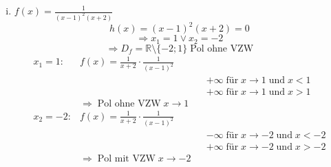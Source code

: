 \documentclass{book}
\begin{document}
\begin{enumerate}[i)]
    \item $f(x) = \frac 1{(x-1)^2(x+2)}$
        \[h(x) = (x-1)^2(x+2) = 0\]
        \[\Rightarrow x_1 = 1 \vee x_2 = -2\]
        \[\Rightarrow D_f = \mathbb{R} \setminus \{-2; 1\} \; \text{Pol ohne VZW}\]
        \begin{align*}
            x_1 = 1: & f(x) = \frac 1 {x+2} \cdot \frac 1 {(x-1)^2}  \\
                     &&&+\infty \; \text{für} \; x \to 1 \; \text{und} \; x < 1\\
                     &&&+\infty \; \text{für} \; x \to 1 \; \text{und} \; x > 1 \\
                     &\Rightarrow \; \text{Pol ohne VZW}\; x \to 1\\
            x_2 = -2: & f(x) = \frac 1 {x+2} \cdot \frac 1 {(x-1)^2} \\
                      &&&-\infty \; \text{für} \; x\to -2 \; \text{und} \; x < -2\\
                      &&&+\infty \; \text{für} \;  x \to -2 \; \text{und} \; x > -2\\
                      &\Rightarrow \; \text{Pol mit VZW} \; x\to -2
        \end{align*}


\end{enumerate}
\end{document}
